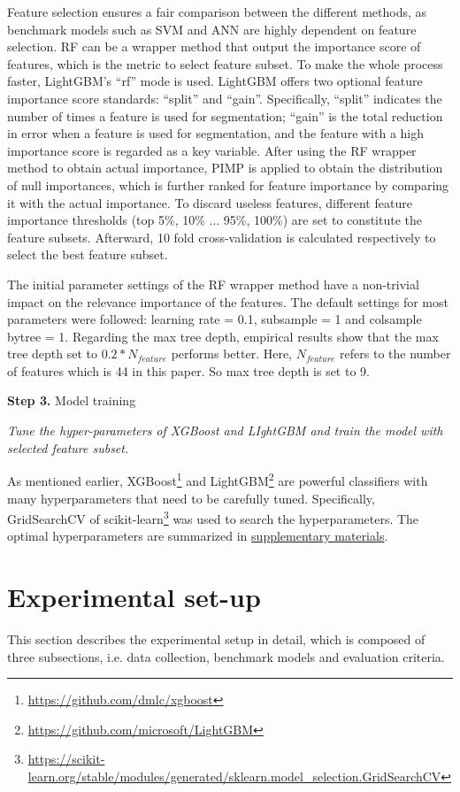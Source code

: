 \documentclass[review]{elsarticle}
\begin{document}
Feature selection ensures a fair comparison between the different methods, as benchmark models such as SVM and ANN are highly dependent on feature selection. RF can be a wrapper method that output the importance score of features, which is the metric to select feature subset. To make the whole process faster, LightGBM's ``rf'' mode is used. LightGBM offers two optional feature importance score standards: ``split'' and ``gain''. Specifically, ``split'' indicates the number of times a feature is used for segmentation; ``gain'' is the total reduction in error when a feature is used for segmentation, and the feature with a high importance score is regarded as a key variable. After using the RF wrapper method to obtain actual importance, PIMP is applied to obtain the distribution of null importances, which is further ranked for feature importance by comparing it with the actual importance. To discard useless features, different feature importance thresholds (top 5\%, 10\% ... 95\%, 100\%) are set to constitute the feature subsets. Afterward, 10 fold cross-validation is calculated respectively to select the best feature subset.

The initial parameter settings of the RF wrapper method have a non-trivial impact on the relevance importance of the features. The default settings for most parameters were followed: learning rate = 0.1, subsample = 1 and colsample bytree = 1. Regarding the max tree depth, empirical results show that the max tree depth set to $0.2*N_{feature}$ performs better. Here, $N_{feature}$ refers to the number of features which is 44 in this paper. So max tree depth is set to 9.

\textbf{Step 3.} Model training

\textit{Tune the hyper-parameters of XGBoost and LIghtGBM and train the model with selected feature subset.}

As mentioned earlier, XGBoost\footnote{\url{https://github.com/dmlc/xgboost}} and LightGBM\footnote{\url{https://github.com/microsoft/LightGBM}} are powerful classifiers with many hyperparameters that need to be carefully tuned. Specifically, GridSearchCV of scikit-learn\footnote{\url{https://scikit-learn.org/stable/modules/generated/sklearn.model_selection.GridSearchCV}} was used to search the hyperparameters. The optimal hyperparameters are summarized in \hyperref[supplementary_materials]{supplementary materials}.

\section{Experimental set-up}
\label{section_4}
This section describes the experimental setup in detail, which is composed of three subsections, i.e. data collection, benchmark models and evaluation criteria.
\end{document}
